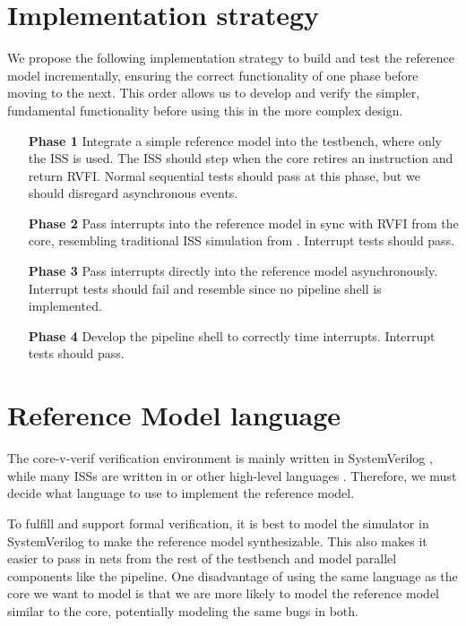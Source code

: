 \section{Implementation strategy}
\label{sec:strategy}

We propose the following implementation strategy to build and test the reference model incrementally, ensuring the correct functionality of one phase before moving to the next. This order allows us to develop and verify the simpler, fundamental functionality before using this in the more complex design.

\begin{enumerate}
    \item[\textbf{Phase 1}] Integrate a simple reference model into the testbench, where only the ISS is used. The ISS should step when the core retires an instruction and return RVFI. Normal sequential tests should pass at this phase, but we should disregard asynchronous events. \label{phase:iss}
    \item[\textbf{Phase 2}] Pass interrupts into the reference model in sync with RVFI from the core, resembling traditional ISS simulation from . Interrupt tests should pass. \label{phase:rvfi_interrupt}
    \item[\textbf{Phase 3}] Pass interrupts directly into the reference model asynchronously. Interrupt tests should fail and resemble  since no pipeline shell is implemented.\label{phase:async_fail}
    \item[\textbf{Phase 4}] Develop the pipeline shell to correctly time interrupts. Interrupt tests should pass. \label{phase:pipeline_shell}
\end{enumerate}




\section{Reference Model language}

The core-v-verif verification environment is mainly written in SystemVerilog \cite{openhwgroupOpenhwgroupCorevverif2023}, while many ISSs are written in \cpp or other high-level languages \cite{SpikeRISCVISA2023}.
Therefore, we must decide what language to use to implement the reference model.

To fulfill \textbf{} and support formal verification, it is best to model the simulator in SystemVerilog to make the reference model synthesizable. This also makes it easier to pass in nets from the rest of the testbench and model parallel components like the pipeline. One disadvantage of using the same language as the core we want to model is that we are more likely to model the reference model similar to the core, potentially modeling the same bugs in both. 

